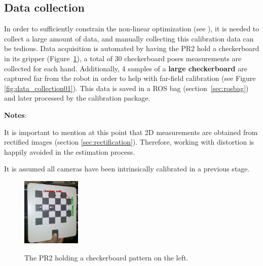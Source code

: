 \subsection{Data collection}

In order to sufficiently constrain the non-linear optimization (see \cite{pr2_calibration_paper}), it is needed to collect a large amount of data, and manually collecting this calibration data can be tedious. Data acquisition is automated by having the PR2 hold a checkerboard in its gripper (Figure~\ref{fig:pr2_holdind_cb}), a total of 30 checkerboard poses measurements are collected for each hand. Additionally, 4 samples of a \textbf{large checkerboard} are captured far from the robot in order to help with far-field calibration (see Figure \ref{fig:data_collection01}). This data is saved in a ROS bag (section~\ref{sec:rosbag}) and later processed by the calibration package.

\noindent

\textbf{Notes}:
\begin{itemize*}
  \item It is important to mention at this point that 2D measurements are obtained from rectified images (section \ref{sec:rectification}). Therefore, working with distortion is happily avoided in the estimation process.
  \item It is assumed all cameras have been intrinsically calibrated in a previous stage.
\end{itemize*}


\begin{figure}[!htbp]
  \centering
  \subfigure
  {
    \includegraphics[width=0.25\textwidth]{images/checkerboard01.png}
  }
  \caption{The PR2 holding a checkerboard pattern on the left.}
 \label{fig:pr2_holdind_cb}
\end{figure}


